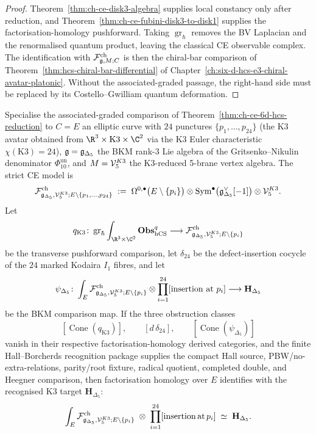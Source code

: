 \begin{proof}
Theorem~\ref{thm:ch-ce-disk3-algebra} supplies local constancy only
after reduction, and Theorem~\ref{thm:ch-ce-fubini-disk3-to-disk1}
supplies the factorisation-homology pushforward. Taking
$\operatorname{gr}_{\hbar}$ removes the BV Laplacian and the
renormalised quantum product, leaving the classical CE observable
complex. The identification with
$\mathcal{F}^{\mathrm{ch}}_{\mathfrak{g},M;C}$ is then the chiral-bar comparison of
Theorem~\ref{thm:hcs-chiral-bar-differential} of
Chapter~\ref{ch:six-d-hcs-e3-chiral-avatar-platonic}. Without the
associated-graded passage, the right-hand side must be replaced by its
Costello--Gwilliam quantum deformation.
\end{proof}

\begin{theorem}[K3 avatar: $C = E$ with 24 punctures, $\fg_{\Delta_5}$,
$\cV^{K3}_5$]
\label{thm:ch-ce-k3-avatar-24-punctures}
\ClaimStatusConditional
{}%
%
Specialise the associated-graded comparison of
Theorem~\ref{thm:ch-ce-6d-hcs-reduction} to $C = E$ an
elliptic curve with $24$ punctures $\{p_1,\ldots,p_{24}\}$ (the K3
avatar obtained from $\R^3\times\mathrm{K3}\times\C^2$ via the K3
Euler characteristic $\chi(\mathrm{K3}) = 24$), $\mathfrak{g} = \mathfrak{g}_{\Delta_5}$
the BKM rank-$3$ Lie algebra of the Gritsenko--Nikulin denominator
$\Phi_{10}^{\mathrm{un}}$, and $M = \mathcal{V}^{K3}_5$ the K3-reduced 5-brane vertex
algebra. The strict CE model is
\begin{equation}
\label{eq:ch-ce-k3-avatar-factalg}
\mathcal{F}^{\mathrm{ch}}_{\mathfrak{g}_{\Delta_5}, \mathcal{V}^{K3}_5; E\setminus\{p_1,\ldots,p_{24}\}}
\;:=\;
\Omega^{0,\bullet}\bigl(E\setminus\{p_i\}\bigr)
\otimes
\mathrm{Sym}^\bullet\bigl(\mathfrak{g}_{\Delta_5}^\vee[-1]\bigr)
\otimes
\mathcal{V}^{K3}_5.
\end{equation}
Let
\[
 q_{\mathrm{K3}}\colon
 \operatorname{gr}_\hbar\int_{\R^3\times\C^2}\Fobs^q_{\hCS}
 \longrightarrow
 \cF^{\mathrm{ch}}_{\fg_{\Delta_5},\cV^{K3}_5;E\setminus\{p_i\}}
\]
be the transverse pushforward comparison, let \(\delta_{24}\) be the
defect-insertion cocycle of the \(24\) marked Kodaira \(I_1\) fibres,
and let
\[
 \psi_{\Delta_5}\colon
 \int_E\mathcal{F}^{\mathrm{ch}}_{\mathfrak{g}_{\Delta_5},\mathcal{V}^{K3}_5;E\setminus\{p_i\}}
 \otimes\prod_{i=1}^{24}[\mathrm{insertion\ at\ }p_i]
 \longrightarrow \mathbf H_{\Delta_5}
\]
be the BKM comparison map. If the three obstruction classes
\[
 [\operatorname{Cone}(q_{\mathrm{K3}})],\qquad
 [d\,\delta_{24}],\qquad
 [\operatorname{Cone}(\psi_{\Delta_5})]
\]
vanish in their respective factorisation-homology derived categories,
and the finite Hall--Borcherds recognition package supplies the compact
Hall source, PBW/no-extra-relations, parity/root fixture, radical
quotient, completed double, and Heegner comparison, then factorisation
homology over \(E\) identifies with the recognised K3 target
$\mathbf H_{\Delta_5}$:
\begin{equation}
\label{eq:ch-ce-k3-avatar-homology}
\int_E \mathcal{F}^{\mathrm{ch}}_{\mathfrak{g}_{\Delta_5}, \mathcal{V}^{K3}_5; E\setminus\{p_i\}}
\;\otimes\; \prod_{i=1}^{24}[\mathrm{insertion\,at\,}p_i]
\;\simeq\;
\mathbf H_{\Delta_5}.
\end{equation}
\end{theorem}

